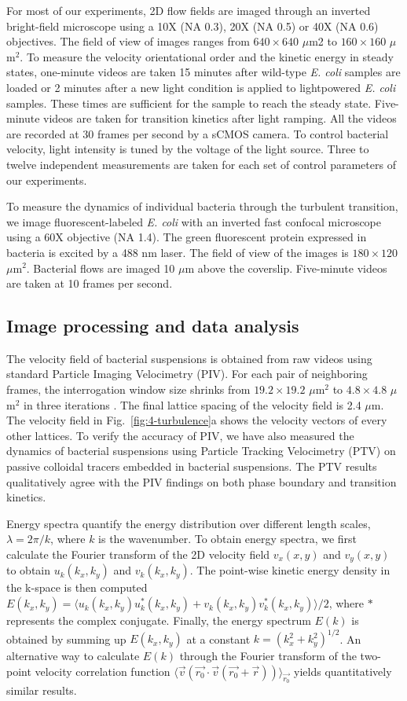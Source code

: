 For most of our experiments, 2D flow fields are imaged through an inverted bright-field microscope using a 10X (NA 0.3), 20X (NA 0.5) or 40X (NA 0.6) objectives. The field of view of images ranges from $640 \times 640$ $\mu$m2 to $160 \times 160$ $\mu$m$^2$. To measure the velocity orientational order and the kinetic energy in steady states, one-minute videos are taken 15 minutes after wild-type \textit{E. coli} samples are loaded or 2 minutes after a new light condition is applied to lightpowered \textit{E. coli} samples. These times are sufficient for the sample to reach the steady state. Five-minute videos are taken for transition kinetics after light ramping. All the videos are recorded at 30 frames per second by a sCMOS camera. To control bacterial velocity, light intensity is tuned by the voltage of the light source. Three to twelve independent measurements are taken for each set of control parameters of our experiments.

To measure the dynamics of individual bacteria through the turbulent transition, we image fluorescent-labeled \textit{E. coli} with an inverted fast confocal microscope using a 60X objective (NA 1.4). The green fluorescent protein expressed in bacteria is excited by a 488 nm laser. The field of view of the images is $180 \times 120$ $\mu$m$^2$. Bacterial flows are imaged 10 $\mu$m above the coverslip. Five-minute videos are taken at 10 frames per second.

\subsection{Image processing and data analysis}
The velocity field of bacterial suspensions is obtained from raw videos using standard Particle Imaging Velocimetry (PIV). For each pair of neighboring frames, the interrogation window size shrinks from $19.2 \times 19.2$ $\mu$m$^2$ to $4.8 \times 4.8$ $\mu$m$^2$ in three iterations \cite{Scarano2001}. The final lattice spacing of the velocity field is 2.4 $\mu$m. The velocity field in Fig.~\ref{fig:4-turbulence}a shows the velocity vectors of every other lattices. To verify the accuracy of PIV,
we have also measured the dynamics of bacterial suspensions using Particle Tracking Velocimetry (PTV) on passive colloidal tracers embedded in bacterial suspensions. The PTV results qualitatively agree with the PIV findings on both phase boundary and transition kinetics.

Energy spectra quantify the energy distribution over different length scales, $\lambda = 2\pi/k$, where $k$ is the wavenumber. To obtain energy spectra, we first calculate the Fourier transform of the 2D velocity field $v_x(x,y)$ and $v_y(x,y)$ to obtain $u_k(k_x,k_y)$ and $v_k(k_x,k_y)$. The point-wise kinetic energy density in the k-space is then computed $E(k_x, k_y) = \langle u_k(k_x, k_y)u^*_k(k_x, k_y)+v_k(k_x, k_y)v_k^*(k_x, k_y)\rangle/2$, where $*$ represents the complex conjugate. Finally, the energy
spectrum $E(k)$ is obtained by summing up $E(k_x,k_y)$ at a constant $k=(k_x^2+k_y^2)^{1/2}$. An alternative way to calculate $E(k)$ through the Fourier transform of the two-point velocity correlation function $\langle \vec{v}(\vec{r_0}\cdot\vec{v}(\vec{r_0}+\vec{r}))  \rangle_{\vec{r_0}}$ yields quantitatively similar results.

